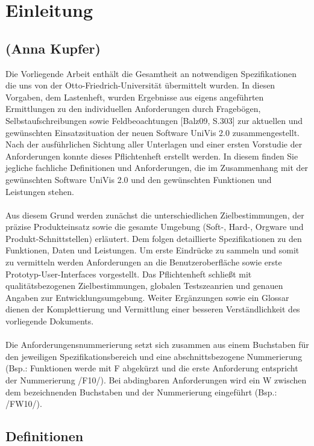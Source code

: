 \section{Einleitung}
\label{sec:Einleitung}

\subsection*{(Anna Kupfer)}

Die Vorliegende Arbeit enthält die Gesamtheit an notwendigen Spezifikationen die uns von der Otto-Friedrich-Universität übermittelt wurden. 
In diesen Vorgaben, dem Lastenheft, wurden Ergebnisse aus eigens angeführten Ermittlungen zu den individuellen Anforderungen durch Fragebögen, Selbstaufschreibungen sowie Feldbeoachtungen [Balz09, S.303] zur aktuellen und gewünschten Einsatzsituation der neuen Software UniVis 2.0 zusammengestellt.
Nach der ausführlichen Sichtung aller Unterlagen und einer ersten Vorstudie der Anforderungen konnte dieses Pflichtenheft erstellt werden. In diesem finden Sie jegliche fachliche Definitionen und Anforderungen, die im Zusammenhang mit der gewünschten Software UniVis 2.0 und den gewünschten Funktionen und Leistungen stehen.
\\
\\
Aus diesem Grund werden zunächst die unterschiedlichen Zielbestimmungen, der präzise Produkteinsatz sowie die gesamte Umgebung (Soft-, Hard-, Orgware und Produkt-Schnittstellen) erläutert.
Dem folgen detaillierte Spezifikationen zu den Funktionen, Daten und Leistungen. Um erste Eindrücke zu sammeln und somit zu vermitteln werden Anforderungen an die Benutzeroberfläche sowie erste Prototyp-User-Interfaces vorgestellt. Das Pflichtenheft schließt mit qualitätsbezogenen Zielbestimmungen, globalen Testszeanrien und genauen Angaben zur Entwicklungsumgebung.
Weiter Ergänzungen sowie ein Glossar dienen der Komplettierung und Vermittlung einer besseren Verständlichkeit des vorliegende Dokuments.
\\
\\
Die Anforderungensnummerierung setzt sich zusammen aus einem Buchstaben für den jeweiligen Spezifikationsbereich und eine abschnittsbezogene Nummerierung (Bsp.: Funktionen werde mit F abgekürzt und die erste Anforderung entspricht der Nummerierung /F10/). Bei abdingbaren Anforderungen wird ein W zwischen dem bezeichnenden Buchstaben und der Nummerierung eingeführt (Bsp.: /FW10/).

\subsection{Definitionen}
\label{sec:Definitionen}

